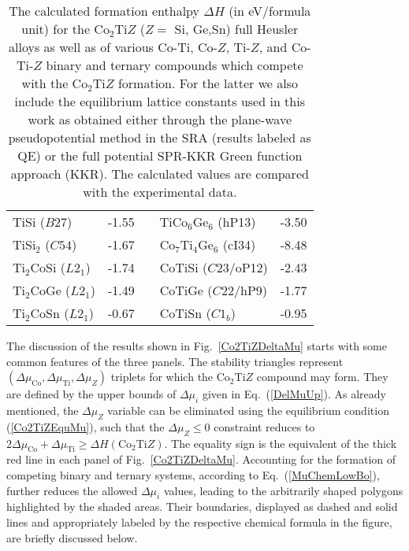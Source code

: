 \documentclass[aps,prb,twocolumn,superscriptaddress,showpacs]{revtex4}
\newcommand{\FG}[1]{Fig.~\ref{#1}}
\newcommand{\EQ}[1]{Eq.~(\ref{#1})}
\begin{document}
\begin{table}
{\begin{tabular}{lrclr}
    TiSi ($B27$)      & -1.55  & & TiCo$_6$Ge$_6$ (hP13) &  -3.50 \\
    TiSi$_2$ ($C54$)  & -1.67  & & Co$_7$Ti$_4$Ge$_6$ (cI34) & -8.48 \\ \hline
   Ti$_2$CoSi ($L2_1$) & -1.74  & & CoTiSi ($C23$/oP12)     &  -2.43 \\
   Ti$_2$CoGe ($L2_1$) & -1.49  & & CoTiGe ($C22$/hP9)     &  -1.77 \\
   Ti$_2$CoSn ($L2_1$) & -0.67  & & CoTiSn ($C1_b$)     &  -0.95 \\\hline\hline
  \end{tabular}}
    \caption{The calculated formation enthalpy $\Delta H$ 
     (in eV/formula unit) for the Co$_2$Ti$Z$ ($Z=$ Si, Ge,Sn)
     full Heusler alloys as well as of various Co-Ti, 
     Co-$Z$, Ti-$Z$, and Co-Ti-$Z$ binary and ternary 
     compounds which compete with the Co$_2$Ti$Z$ formation.
     For the latter we also include the 
     equilibrium lattice constants used in this work
     as obtained either through the 
     plane-wave pseudopotential method in 
     the SRA (results labeled as QE) or the full potential 
     SPR-KKR Green function approach (KKR).
     The calculated values are compared with the
     experimental data.\cite{WZ73,CSP+96}}
    \label{DeltaHCompounds}
\end{table}


The discussion of the results shown in \FG{Co2TiZDeltaMu}
starts with some common features of the 
three panels. The stability triangles represent
$(\Delta\mu_\text{Co},\Delta\mu_\text{Ti},\Delta\mu_Z)$
triplets for which the Co$_2$Ti$Z$ compound may form.
They are defined by the
upper bounds of $\Delta\mu_i$ given in \EQ{DelMuUp}.
As already mentioned, the $\Delta\mu_Z$ variable can be eliminated
using the equilibrium condition (\ref{Co2TiZEquMu}), such that
the $\Delta\mu_Z\leq 0$ constraint reduces to
$2\Delta\mu_\text{Co} + \Delta\mu_\text{Ti} \geq 
\Delta H(\text{Co}_2\text{Ti}Z)$. The equality sign 
is the equivalent of the thick red line in each panel 
of \FG{Co2TiZDeltaMu}. Accounting for 
the formation of competing binary and ternary systems, 
according to \EQ{MuChemLowBo}, further reduces the
allowed $\Delta\mu_i$ values, leading to 
the arbitrarily shaped polygons highlighted by 
the shaded areas. Their boundaries,
displayed as dashed and solid lines and
appropriately labeled by the respective chemical formula
in the figure, are briefly discussed below. 
\end{document}
